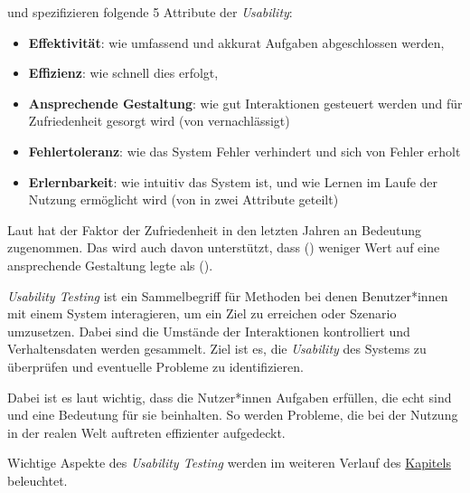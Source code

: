 \citeauthor{quesenberyDimensionsUsability2003} \cite{quesenberyDimensionsUsability2003} und \citeauthor{nielsenUsabilityEngineering1994} \cite{nielsenUsabilityEngineering1994} spezifizieren folgende 5 Attribute der \textit{Usability}:
\begin{itemize}
  \item \textbf{Effektivität}: wie umfassend und akkurat Aufgaben abgeschlossen werden,
  \item \textbf{Effizienz}: wie schnell dies erfolgt,
  \item \textbf{Ansprechende Gestaltung}: wie gut Interaktionen gesteuert werden und für Zufriedenheit gesorgt wird (von \citeauthor{nielsenUsabilityEngineering1994} vernachlässigt)
  \item \textbf{Fehlertoleranz}: wie das System Fehler verhindert und sich von Fehler erholt
  \item \textbf{Erlernbarkeit}: wie intuitiv das System ist, und wie Lernen im Laufe der Nutzung ermöglicht wird (von \citeauthor{nielsenUsabilityEngineering1994} in zwei Attribute geteilt)
\end{itemize}

Laut \citeauthor{barnumUsabilityTesting2021} \cite{barnumUsabilityTesting2021} hat der Faktor der Zufriedenheit in den letzten Jahren an Bedeutung zugenommen. Das wird auch davon unterstützt, dass \citeauthor{nielsenUsabilityEngineering1994} (\citeyear{nielsenUsabilityEngineering1994}) weniger Wert auf eine ansprechende Gestaltung legte als \citeauthor{quesenberyDimensionsUsability2003} (\citeyear{quesenberyDimensionsUsability2003}).

\newpage

\textit{Usability Testing} ist ein Sammelbegriff für Methoden bei denen Benutzer*innen mit einem System interagieren, um ein Ziel zu erreichen oder Szenario umzusetzen. Dabei sind die Umstände der Interaktionen kontrolliert und Verhaltensdaten werden gesammelt. \cite{wichanskyUsabilityTesting2000}
Ziel ist es, die \textit{Usability} des Systems zu überprüfen und eventuelle Probleme zu identifizieren.

Dabei ist es laut \citeauthor{barnumUsabilityTesting2021} \cite{barnumUsabilityTesting2021} wichtig, dass die Nutzer*innen Aufgaben erfüllen, die echt sind und eine Bedeutung für sie beinhalten. So werden Probleme, die bei der Nutzung in der realen Welt auftreten effizienter aufgedeckt.

Wichtige Aspekte des \textit{Usability Testing} werden im weiteren Verlauf des \hyperref[section:usability-testing]{Kapitels} beleuchtet.
